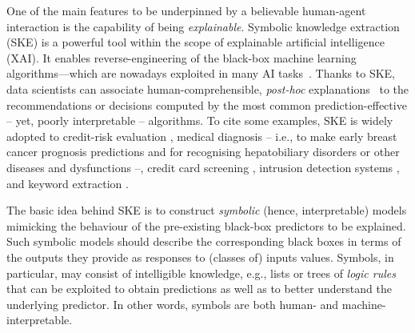\documentclass[
]{ceurart}
\begin{document}
One of the main features to be underpinned by a  believable human-agent interaction is the capability of being \emph{explainable}. Symbolic knowledge extraction (SKE) is a powerful tool within the scope of explainable artificial intelligence (XAI).
%
It enables reverse-engineering of the black-box machine learning algorithms---which are nowadays exploited in many AI tasks~\cite{rocha2012far}.
%
Thanks to SKE, data scientists can associate human-comprehensible, \emph{post-hoc} explanations~\cite{KENNY2021103459} to the recommendations or decisions computed by the most common prediction-effective -- yet, poorly interpretable -- algorithms.
%
To cite some examples, SKE is widely adopted to credit-risk evaluation \cite{baesens2003using,baesens2001building,steiner2006using}, medical diagnosis -- i.e., to make early breast cancer prognosis predictions \cite{franco2007early} and for recognising hepatobiliary disorders \cite{hayashi2000comparison} or other diseases and dysfunctions \cite{bologna1997three} --, credit card screening \cite{setiono2011rule}, intrusion detection systems \cite{hofmann2003rule}, and keyword extraction \cite{azcarraga2012keyword}.

The basic idea behind SKE is to construct \emph{symbolic} (hence, interpretable) models mimicking the behaviour of the pre-existing black-box predictors to be explained.
%
Such symbolic models should describe the corresponding black boxes in terms of the outputs they provide as responses to (classes of) inputs values.
%
Symbols, in particular, may consist of intelligible knowledge, e.g., lists or trees of \emph{logic rules} that can be exploited to obtain predictions as well as to better understand the underlying predictor.
%
In other words, symbols are both human- and machine-interpretable.
\end{document}
